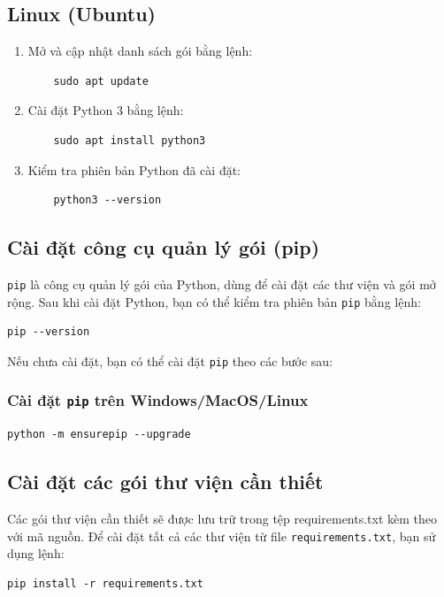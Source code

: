 \subsection{Linux (Ubuntu)}
\begin{enumerate}
    \item Mở  và cập nhật danh sách gói bằng lệnh:
    \begin{verbatim}
    sudo apt update
    \end{verbatim}
    \item Cài đặt Python 3 bằng lệnh:
    \begin{verbatim}
    sudo apt install python3
    \end{verbatim}
    \item Kiểm tra phiên bản Python đã cài đặt:
    \begin{verbatim}
    python3 --version
    \end{verbatim}
\end{enumerate}

\subsection{Cài đặt công cụ quản lý gói (pip)}
\texttt{pip} là công cụ quản lý gói của Python, dùng để cài đặt các thư viện và gói mở rộng. Sau khi cài đặt Python, bạn có thể kiểm tra phiên bản \texttt{pip} bằng lệnh:
\begin{verbatim}
pip --version
\end{verbatim}
Nếu chưa cài đặt, bạn có thể cài đặt \texttt{pip} theo các bước sau:

\subsubsection{Cài đặt \texttt{pip} trên Windows/MacOS/Linux}
\begin{verbatim}
python -m ensurepip --upgrade
\end{verbatim}

\subsection{Cài đặt các gói thư viện cần thiết}
Các gói thư viện cần thiết sẽ được lưu trữ trong tệp requirements.txt kèm theo với mã nguồn. Để cài đặt tất cả các thư viện từ file \texttt{requirements.txt}, bạn sử dụng lệnh:
\begin{verbatim}
pip install -r requirements.txt
\end{verbatim}

